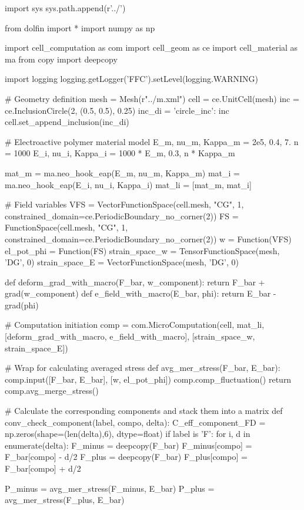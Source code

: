\begin{python}
import sys
sys.path.append(r'../')

from dolfin import *
import numpy as np

import cell_computation as com
import cell_geom as ce
import cell_material as ma
from copy import deepcopy

import logging
logging.getLogger('FFC').setLevel(logging.WARNING)

# Geometry definition
mesh = Mesh(r"../m.xml")
cell = ce.UnitCell(mesh)
inc = ce.InclusionCircle(2, (0.5, 0.5), 0.25)
inc_di = {'circle_inc': inc}
cell.set_append_inclusion(inc_di)

# Electroactive polymer material model
E_m, nu_m, Kappa_m = 2e5, 0.4, 7.
n = 1000  
E_i, nu_i, Kappa_i = 1000 * E_m, 0.3, n * Kappa_m

mat_m = ma.neo_hook_eap(E_m, nu_m, Kappa_m)
mat_i = ma.neo_hook_eap(E_i, nu_i, Kappa_i)
mat_li = [mat_m, mat_i]

# Field variables
VFS = VectorFunctionSpace(cell.mesh, "CG", 1,
                          constrained_domain=ce.PeriodicBoundary_no_corner(2))
FS = FunctionSpace(cell.mesh, "CG", 1,
                   constrained_domain=ce.PeriodicBoundary_no_corner(2))
w = Function(VFS)
el_pot_phi = Function(FS)
strain_space_w = TensorFunctionSpace(mesh, 'DG', 0)
strain_space_E = VectorFunctionSpace(mesh, 'DG', 0)

def deform_grad_with_macro(F_bar, w_component):
    return F_bar + grad(w_component)
def e_field_with_macro(E_bar, phi):
    return E_bar - grad(phi)

# Computation initiation
comp = com.MicroComputation(cell, mat_li,
                        [deform_grad_with_macro, e_field_with_macro],
                        [strain_space_w, strain_space_E])

# Wrap for calculating averaged stress
def avg_mer_stress(F_bar, E_bar):
    comp.input([F_bar, E_bar], [w, el_pot_phi])
    comp.comp_fluctuation()
    return comp.avg_merge_stress()
    
# Calculate the corresponding components and stack them into a matrix
def conv_check_component(label, compo, delta):
    C_eff_component_FD = np.zeros(shape=(len(delta),6), dtype=float)
    if label is 'F':
        for i, d in enumerate(delta):
            F_minus = deepcopy(F_bar)
            F_minus[compo] = F_bar[compo] - d/2
            F_plus = deepcopy(F_bar)
            F_plus[compo] = F_bar[compo] + d/2

            P_minus = avg_mer_stress(F_minus, E_bar)
            P_plus  = avg_mer_stress(F_plus, E_bar)
            

\end{python}
